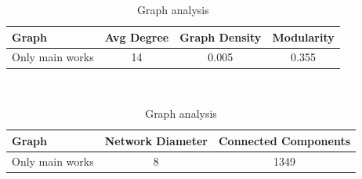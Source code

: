 \begin{table}[!hbt]
	\begin{center}
	\caption{Graph analysis}
	\label{tab:newGraphAnalysis}
	\begin{tabular}{|l|c|c|c|}
		\hline
		Graph & Avg Degree & Graph Density & Modularity \\
		\hline
		Only main works & 14 & 0.005 & 0.355 \\
		\hline
	\end{tabular}\\
	\smallskip
	\begin{tabular}{|l|c|c|}
		\hline
		Graph & Network Diameter & Connected Components \\
		\hline
		Only main works & 8 & 1349 \\
		\hline
	\end{tabular}
	\end{center}
\end{table}


